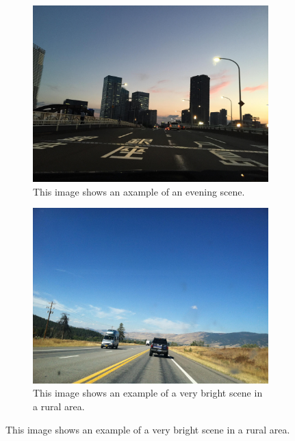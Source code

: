 \begin{figure}[]
	\centering
	\begin{subfigure}{.45\textwidth}
		\centering
		\includegraphics[width=\linewidth]{figures/experiments/dataset/1.jpg}
		\caption[Dataset Sample 1]{This image shows an axample of an evening scene.}
		\label{fig:dataset-1}
	\end{subfigure}
	\hfill
	\begin{subfigure}{.45\textwidth}
		\centering
		\includegraphics[width=\linewidth]{figures/experiments/dataset/2.jpg}
		\caption[Dataset Sample 2]{This image shows an example of a very bright scene in a rural area.}
		\label{fig:dataset-2}
	\end{subfigure}
	

\end{figure}
